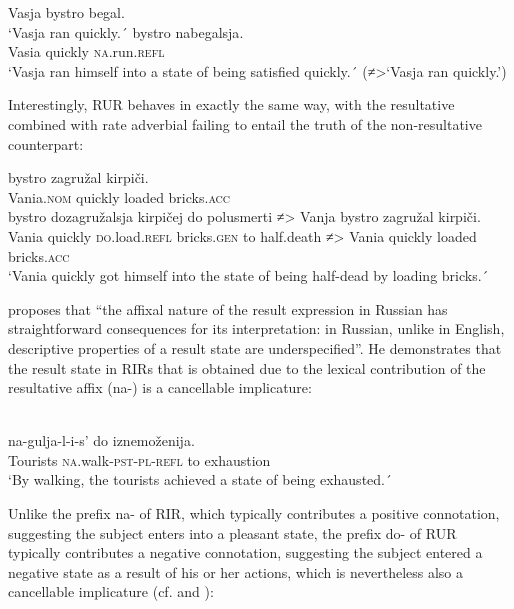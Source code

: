 \documentclass[output=paper,colorlinks,citecolor=brown,nonflat]{./langscibook}
\begin{document}
\ea%
    \label{ex:antonyuk:40}
    \ea \label{ex:antonyuk:40a}
    {Vasja} {bystro} {begal}.\\
    `Vasja ran quickly.´
    \ex \label{ex:antonyuk:40b}
     {bystro} {nabegalsja}.\\
    Vasia quickly \textsc{na}.run.\textsc{refl}\\
    \glt `Vasja ran himself into a state of being satisfied quickly.´ (≠>‘Vasja ran quickly.’)
    \z
\z

Interestingly, RUR behaves in exactly the same way, with the resultative combined with rate adverbial failing to entail the truth of the non-resultative counterpart:

\ea%
    \label{ex:antonyuk:41}
    \ea \label{ex:antonyuk:41a}
             {bystro}   {zagružal} {kirpiči}.\\
    Vania.\textsc{nom} quickly loaded     bricks.\textsc{acc}\\
    \ex \label{ex:antonyuk:41b}
     {bystro}     {dozagružalsja}   {kirpičej}       {do}  {polusmerti} {≠>} {Vanja}  {bystro}   {zagružal}   {kirpiči}. \\
    Vania quickly \textsc{do}.load.\textsc{refl}   bricks.\textsc{gen}  to  half.death  ≠> Vania quickly loaded   bricks.\textsc{acc}\\
    \glt `Vania quickly got himself into the state of being half-dead by loading bricks.´
    \z
\z

\citeauthor{Tatevosov2010} proposes that “the affixal nature of the result expression in Russian has straightforward consequences for its interpretation: in Russian, unlike in English, descriptive properties of a result state are underspecified”. He demonstrates that the result state in RIRs that is obtained due to the lexical contribution of the resultative affix ({na}{}-) is a cancellable implicature:

\ea%
    \label{ex:antonyuk:42}
    \citep{Tatevosov2010}\\
     {na-gulja-l-i-s’} {do} {iznemoženija}.\\
    Tourists   \textsc{na}.walk\textsc{-pst-pl-refl} to exhaustion\\
    \glt `By walking, the tourists achieved a state of being exhausted.´
    \z

Unlike the prefix {na}{}- of RIR, which typically contributes a positive connotation, suggesting the subject enters into a pleasant state, the prefix {do{}-} of RUR typically contributes a negative connotation, suggesting the subject entered a negative state as a result of his or her actions, which is nevertheless also a cancellable implicature (cf.  and ):
\end{document}
